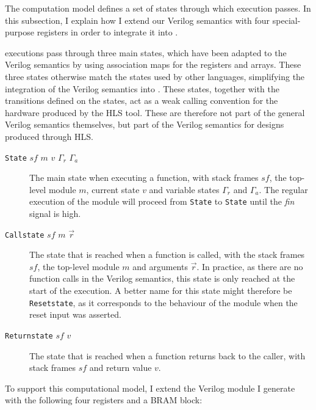 The \compcert{} computation model defines a set of states through which
execution passes. In this subsection, I explain how I extend our Verilog
semantics with four special-purpose registers in order to integrate it into
\compcert{}.

\compcert{} executions pass through three main states, which have been adapted
to the Verilog semantics by using association maps for the registers and arrays.
These three states otherwise match the states used by other languages,
simplifying the integration of the Verilog semantics into \compcert{}.  These
states, together with the transitions defined on the states, act as a weak
calling convention for the hardware produced by the \gls{HLS} tool.  These are
therefore not part of the general Verilog semantics themselves, but part of the
Verilog semantics for designs produced through \gls{HLS}.
\begin{description}
\item[\texttt{State} $\mathit{sf}$ $m$ $v$ $\Gamma_{r}$ $\Gamma_{a}$] The main
  state when executing a function, with stack frames $\mathit{sf}$, the top-level module $m$, current state $v$ and variable states $\Gamma_{r}$ and
  $\Gamma_{a}$.  The regular execution of the module will proceed from
  \texttt{State} to \texttt{State} until the \textit{fin} signal is high.
  \item[\texttt{Callstate} $\mathit{sf}$ $m$ $\vec{r}$] The state that is
    reached when a function is called, with the stack frames
    $\mathit{sf}$, the top-level module $m$ and arguments $\vec{r}$.  In practice, as
    there are no function calls in the Verilog semantics, this state is only
    reached at the start of the execution.  A better name for this state
    might therefore be \texttt{Resetstate}, as it corresponds to the behaviour
    of the module when the reset input was asserted.
  \item[\texttt{Returnstate} $\mathit{sf}$ $v$] The state that is reached when a
    function returns back to the caller, with stack frames $\mathit{sf}$ and
    return value $v$.
\end{description}

To support this computational model, I extend the Verilog module I generate with
the following four registers and a \gls{BRAM} block:


